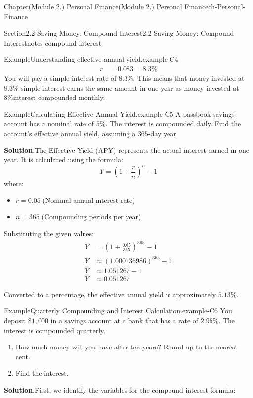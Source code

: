 \documentclass[oneside,10pt,]{book}
\newcommand{\blocktitlefont}{\relax}
\newcommand{\ptxlistdisc}{\raisebox{0.3ex}{\textbullet}}
\newcommand{\amp}{&}
\begin{document}
\begin{chapterptx}{Chapter}{(Module 2.) Personal Finance}{}{(Module 2.) Personal Finance}{}{}{ch-Personal-Finance}
\begin{sectionptx}{Section}{2.2 Saving Money: Compound Interest}{}{2.2 Saving Money: Compound Interest}{}{}{notes-compound-interest}
\begin{example}{Example}{Understanding effective annual yield.}{example-C4}
\begin{align*}
r \amp = 0.083=8.3 \% 
\end{align*}
You will pay a simple interest rate of 8.3\%. This means that money invested at 8.3\% simple interest earns the same amount in one year as money invested at 8\%interest compounded monthly.%
\end{example}
\begin{example}{Example}{Calculating Effective Annual Yield.}{example-C5}%
A passbook savings account has a nominal rate of \(5\%\). The interest is compounded daily. Find the account's effective annual yield, assuming a \(365\)-day year.%
\par\smallskip%
\noindent\textbf{\blocktitlefont Solution}.\hypertarget{example-C5-3}{}\quad{}The Effective Yield (APY) represents the actual interest earned in one year. It is calculated using the formula:%
\begin{equation*}
Y = \left(1 + \frac{r}{n}\right)^n - 1
\end{equation*}
where:%
\begin{itemize}[label=\ptxlistdisc]
\item{}\(r = 0.05\) (Nominal annual interest rate)%
\item{}\(n = 365\) (Compounding periods per year)%
\end{itemize}
%
\par
Substituting the given values:%
\begin{align*}
Y \amp = \left(1 + \frac{0.05}{365}\right)^{365} - 1\\
Y \amp \approx (1.000136986)^{365} - 1\\
Y \amp \approx 1.051267 - 1\\
Y \amp \approx 0.051267
\end{align*}
%
\par
Converted to a percentage, the effective annual yield is approximately \(5.13\%\).%
\end{example}
\begin{example}{Example}{Quarterly Compounding and Interest Calculation.}{example-C6}%
You deposit \(\$1,000\) in a savings account at a bank that has a rate of \(2.95\%\). The interest is compounded quarterly.%
\begin{enumerate}[label={\alph*}]
\item{}How much money will you have after ten years? Round up to the nearest cent.%
\item{}Find the interest.%
\end{enumerate}
%
\par\smallskip%
\noindent\textbf{\blocktitlefont Solution}.\hypertarget{example-C6-3}{}\quad{}First, we identify the variables for the compound interest formula:%

\end{example}
\end{sectionptx}
\end{chapterptx}
\end{document}
